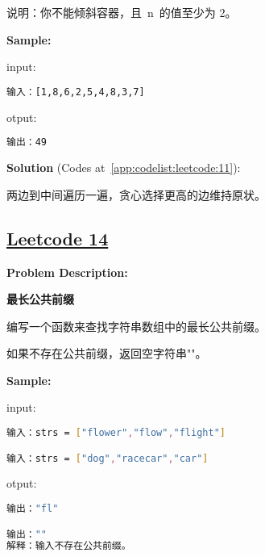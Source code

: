 说明：你不能倾斜容器，且 n 的值至少为 2。\par


\textbf{Sample:}\par

input:\par

\begin{lstlisting}[language=bash]
输入：[1,8,6,2,5,4,8,3,7]
\end{lstlisting}

otput:\par

\begin{lstlisting}[language=bash]
输出：49
\end{lstlisting}

\textbf{Solution }(Codes at~\ref{app:codelist:leetcode:11}):\par

两边到中间遍历一遍，贪心选择更高的边维持原状。\par



\subsection{\href{https://leetcode-cn.com/}{Leetcode 14}}\label{app:problemlist:leetcode:14}

\textbf{Problem Description:}\par

\textbf{最长公共前缀}\par

编写一个函数来查找字符串数组中的最长公共前缀。\par

如果不存在公共前缀，返回空字符串""。\par


\textbf{Sample:}\par

input:\par

\begin{lstlisting}[language=bash]
输入：strs = ["flower","flow","flight"]

输入：strs = ["dog","racecar","car"]
\end{lstlisting}

otput:\par

\begin{lstlisting}[language=bash]
输出："fl"

输出：""
解释：输入不存在公共前缀。
\end{lstlisting}

